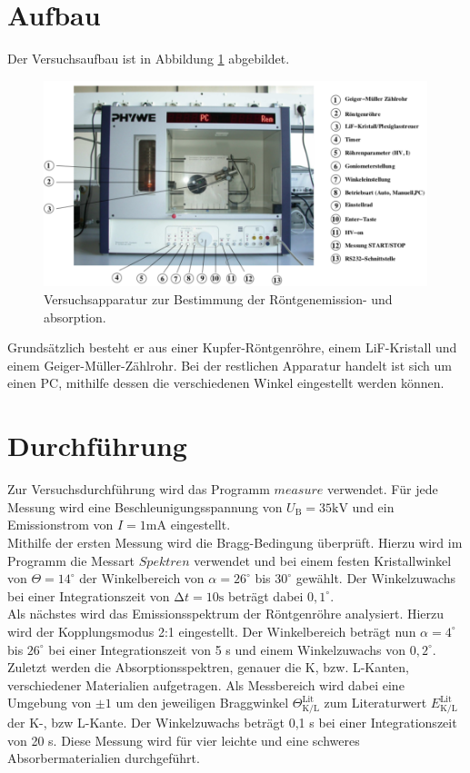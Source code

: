 \section{Aufbau}
\label{sec:Aufbau}
Der Versuchsaufbau ist in Abbildung \ref{fig:Aufbau} abgebildet. 
\begin{figure}[h]
    \centering
    \includegraphics[height=6cm]{Aufbau/Aufbau.pdf}
    \caption{Versuchsapparatur zur Bestimmung der Röntgenemission- und absorption.}
    \label{fig:Aufbau}
\end{figure}
Grundsätzlich besteht er aus einer Kupfer-Röntgenröhre, einem LiF-Kristall und einem Geiger-Müller-Zählrohr. Bei der restlichen Apparatur handelt ist sich um einen PC, mithilfe dessen die verschiedenen Winkel eingestellt werden können. 

\section{Durchführung}
\label{sec:Durchführung}
Zur Versuchsdurchführung wird das Programm $measure$ verwendet. Für jede Messung wird eine Beschleunigungsspannung von $U_\text{B} = 35 \text{kV}$ und ein Emissionstrom von $I = 1 \text{mA}$ eingestellt. \\
Mithilfe der ersten Messung wird die Bragg-Bedingung überprüft. Hierzu wird im Programm die Messart $Spektren$ verwendet und bei einem festen Kristallwinkel von $\Theta = 14^\circ$ der Winkelbereich von $\alpha = 26^\circ$ bis $30^\circ$ gewählt. Der Winkelzuwachs bei einer Integrationszeit von $\increment t = 10 \text{s}$ beträgt dabei $0,1^\circ$.\\
Als nächstes wird das Emissionsspektrum der Röntgenröhre analysiert. Hierzu wird der Kopplungsmodus 2:1 eingestellt. Der Winkelbereich beträgt nun $\alpha = 4^\circ$ bis $26^\circ$ bei einer Integrationszeit von 5 s und einem Winkelzuwachs von $0,2^\circ$.\\
Zuletzt werden die Absorptionsspektren, genauer die K, bzw. L-Kanten, verschiedener Materialien aufgetragen. Als Messbereich wird dabei eine Umgebung von $\pm 1$ um den jeweiligen Braggwinkel $\Theta_\text{K/L}^\text{Lit}$ zum Literaturwert $E_\text{K/L}^\text{Lit}$ der K-, bzw L-Kante. Der Winkelzuwachs beträgt 0,1 s bei einer Integrationszeit von 20 s. Diese Messung wird für vier leichte und eine schweres Absorbermaterialien durchgeführt.